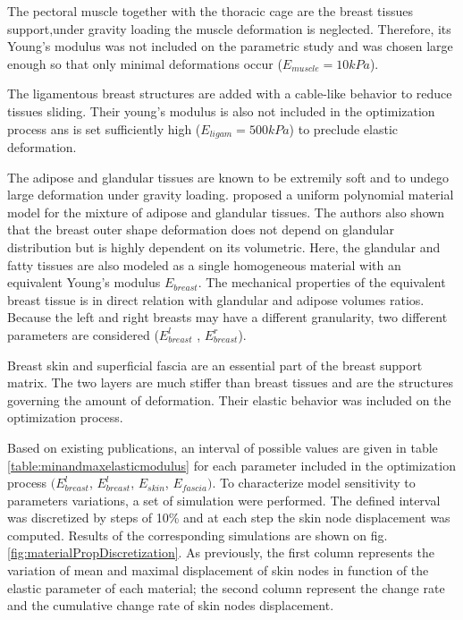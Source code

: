 The pectoral muscle together with the thoracic cage are the breast tissues support,under gravity loading the muscle deformation is neglected. Therefore, its Young's modulus was not included on the parametric study and was chosen large enough so that only minimal deformations occur ($E_{muscle}=10kPa$).

The  ligamentous breast structures are added with a cable-like behavior to reduce tissues sliding. Their young's modulus is also not included in the optimization process ans is set sufficiently high ($E_{ligam}=500kPa$) to preclude elastic deformation. 

The adipose and glandular tissues are known to be extremily soft and to undego large deformation under gravity loading.  \cite{calvo_polynomial_2015} proposed a uniform polynomial material model for the mixture of adipose and glandular tissues. The authors also shown that the breast outer shape deformation does not depend on glandular distribution but is highly dependent on its volumetric. Here, the glandular and fatty tissues are also modeled as a single homogeneous material with an equivalent Young's modulus $E_{breast}$. The mechanical properties of the equivalent breast tissue is in direct relation with glandular and adipose volumes ratios. Because the left and right breasts may have a different granularity, two different parameters are considered ($E_{breast}^l$ , $E_{breast}^r$).

Breast skin and superficial fascia are an essential part of the breast support matrix. The two layers are much stiffer than breast tissues and are the structures governing the amount of deformation. Their elastic behavior was included on the optimization process.

 Based on existing publications, an interval of possible values are given in table \ref{table:minandmaxelasticmodulus} for each parameter included in the optimization process $(E_{breast}^l$, $E_{breast}^l$, $E_{skin}$, $E_{fascia})$. To characterize model sensitivity to parameters variations, a set of simulation were performed. The defined interval was discretized by steps of 10\% and at each step the skin node displacement was computed. Results of the corresponding simulations are shown on fig.\ref{fig:materialPropDiscretization}. As previously, the first column represents  the variation of mean and maximal displacement of skin nodes in function of the elastic parameter of each material; the second column represent the change rate and the cumulative change rate of skin nodes displacement.


